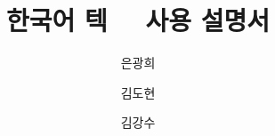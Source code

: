 \usepackage{makeidx}
\makeindex

\usepackage{longtable}

\renewcommand\topfraction{.88}
\renewcommand\floatpagefraction{.75}

\newcommand\pkg[1]{%
   \texttt{#1}\ 패키지\ifEUCmode\fjs{\jung}\else\jung\fi%
   \index{패키지!#1}%
}
\newcommand\cls[1]{%
   \texttt{#1}\ 클래스\ifEUCmode\fjs{\jung}\else\jung\fi%
   \index{클래스!#1}%
}
\newcommand\file[1]{%
   \texttt{#1}%
   \index{파일!#1}%
}
\providecommand\PageName{%
   페이지%
}
\makeatletter
\newcommand\KTUGFAQ[2][\@empty]{%
   \ifx#1\empty
      \href{http://faq.ktug.or.kr/faq/#2}{\textsf{KTUGFaq}\texttt{/#2}}%
   \else
	  \href{http://faq.ktug.or.kr/faq/#1}{\textsf{KTUGFaq}\texttt{/#2}}%
   \fi
}
\newcommand\wi[2][\@empty]{%
   #2%
   \ifx#1\@empty\index{#2}\else
   \index{#1!#2}\fi
}
\makeatother

\usepackage{multicol}
\usepackage{framed}

\newcommand\LAMBDA{\index{람브다@Lambda(Λ)}\texttt{Lambda}\allowbreak(Λ)}
\providecommand\HLaTeX{H\LaTeX}

\usepackage{amsmath}

\ifEUCmode
 \usepackage[normalem]{myulem}
 \providecommand\thispkg{\kotex/euc}
\else
 \usepackage[normalem]{ulem}
 \usepackage{eurosym}
 \newcommand\thispkg{%
   \kotex/utf%
 }
 \let\HangulFrenchspacing\frenchspacing
 \let\HangulNonfrenchspacing\nonfrenchspacing
 \newif\ifotfont\otfontfalse
 \usepackage{dhucs-sectsty}
 \usepackage{dhucs-trivcj}
 \usepackage{dhucs-gremph}
 \let\caution\relax
 \let\thisversion\kotexversion
\fi

\usepackage{fancyvrb}

\usepackage{kotexguide}



\title{한국어 텍 \kotex~\kotexversion~사용 설명서}
\author{은광희\and 김도현\and 김강수}
\date{\kotexdate}

\maketitle

